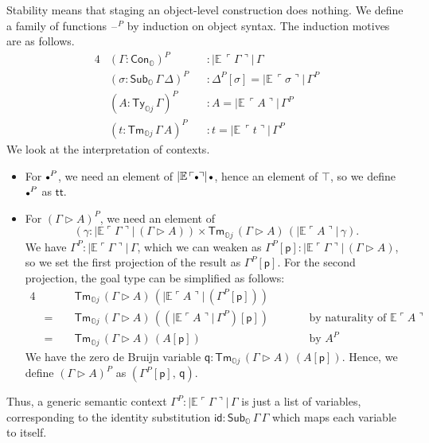 \documentclass[acmsmall]{acmart}
\newcommand{\msf}[1]{\mathsf{#1}}
\newcommand{\mbb}[1]{\mathbb{#1}}
\newcommand{\ext}{\triangleright}
\newcommand{\mbbo}{\mbb{O}}
\newcommand{\Ty}{\msf{Ty}}
\newcommand{\Tm}{\msf{Tm}}
\newcommand{\Cono}{\msf{Con}_{\mbbo}}
\newcommand{\Subo}{\msf{Sub}_{\mbbo}}
\newcommand{\p}{\mathsf{p}}
\newcommand{\q}{\mathsf{q}}
\renewcommand{\tt}{\msf{tt}}
\newcommand{\emptycon}{\scaleobj{.75}\bullet}
\newcommand{\id}{\msf{id}}
\newcommand{\blank}{{\mathord{\hspace{1pt}\text{--}\hspace{1pt}}}}
\newcommand{\emb}[1]{\ulcorner#1\urcorner}
\newcommand{\ev}{\mbb{E}}
\theoremstyle{remark}
\begin{document}
Stability means that staging an object-level construction does nothing. We
define a family of functions $\blank^P$ by induction on object syntax. The
induction motives are as follows.
\begin{alignat*}{4}
  & (\Gamma : \Cono)^P                    &&: |\ev\,\emb{\Gamma}|\,\Gamma\\
  & (\sigma : \Subo\,\Gamma\,\Delta)^P    &&: \Delta^P[\sigma] = |\ev\,\emb{\sigma}|\,\Gamma^P\\
  & (A      : \Ty_{\mbbo j}\,\Gamma)^P      &&: A = |\ev\,\emb{A}|\,\Gamma^P\\
  & (t      : \Tm_{\mbbo j}\,\Gamma\,A)^P   &&: t = |\ev\,\emb{t}|\,\Gamma^P
\end{alignat*}
We look at the interpretation of contexts.
\begin{itemize}
\item  For $\emptycon^P$, we need an element of $|\ev\,\emb{\emptycon}|\,\emptycon$, hence
  an element of $\top$, so we define $\emptycon^P$ as $\tt$.
\item
  For $(\Gamma \ext A)^P$, we need an element of
    \[(\gamma : |\ev{\emb{\Gamma}}|\,(\Gamma\ext A)) \times \Tm_{\mbbo j}\,(\Gamma \ext A)\,(|\ev\emb{A}|\,\gamma).\]
  We have $\Gamma^P : |\ev{\emb{\Gamma}}|\,\Gamma$, which we can weaken as
  $\Gamma^P[\p] : |\ev{\emb{\Gamma}}|\,(\Gamma \ext A)$, so we set the first
  projection of the result as $\Gamma^P[\p]$. For the second projection, the
  goal type can be simplified as follows:
  \begin{alignat*}{4}
    &       &&\Tm_{\mbbo j}\,(\Gamma \ext A)\,(|\ev\emb{A}|\,(\Gamma^P[\p])) && \\
    & =\,\, &&\Tm_{\mbbo j}\,(\Gamma \ext A)\,((|\ev\emb{A}|\,\Gamma^P)[\p]) &&\hspace{2em} \text{by naturality of $\ev\emb{A}$}\\
    & =\,\, &&\Tm_{\mbbo j}\,(\Gamma \ext A)\,(A[\p])                        &&\hspace{2em} \text{by $A^P$}
  \end{alignat*}
  We have the zero de Bruijn variable $\q : \Tm_{\mbbo j}\,(\Gamma \ext
  A)\,(A[\p])$.  Hence, we define $(\Gamma \ext A)^P$ as $(\Gamma^P[\p],\,\q)$.
\end{itemize}

Thus, a generic semantic context $\Gamma^P : |\ev\emb{\Gamma}|\,\Gamma$ is just
a list of variables, corresponding to the identity substitution $\id :
\Subo\,\Gamma\,\Gamma$ which maps each variable to itself.
\end{document}
